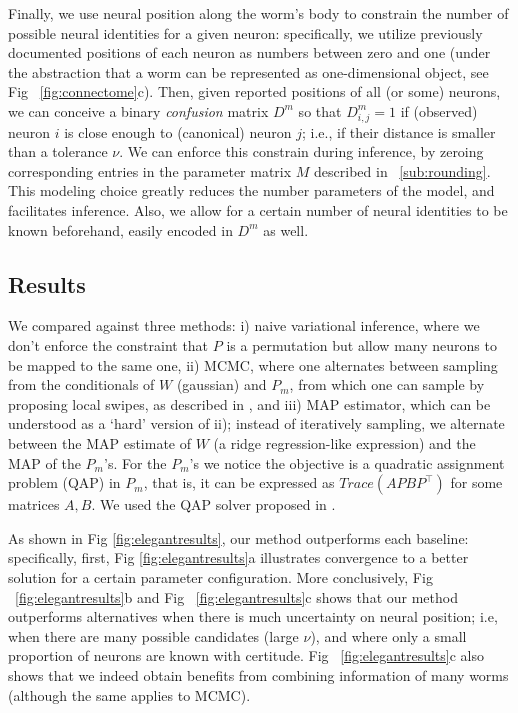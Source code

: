 \documentclass[twoside]{article}
\begin{document}
Finally, we use neural position along the worm's body to constrain the number of possible neural identities for a given neuron: specifically, we utilize previously documented positions of each neuron as numbers between zero and one \cite{white1986structure,wormatlas} (under the abstraction that a worm can be represented as one-dimensional object, see Fig ~\ref{fig:connectome}c). Then, given reported positions of all (or some) neurons, we can conceive a binary \textit{confusion} matrix $D^m$ so that $D^m_{i,j}=1$ if (observed) neuron $i$ is close enough to (canonical) neuron $j$; i.e., if their distance is smaller than a tolerance $\nu$. We can enforce this constrain during inference, by zeroing corresponding entries in the parameter matrix $M$ described in ~\ref{sub:rounding}.  This modeling choice greatly reduces the number parameters of the model, and facilitates inference. Also, we allow for a certain number of neural identities to be known beforehand, easily encoded in $D^m$ as well.

\subsection{Results}

We compared against three methods: i) naive variational inference, where we don't enforce the constraint that $P$ is a permutation but allow many neurons to be mapped to the same one, ii) MCMC, where one alternates between sampling from the conditionals of $W$ (gaussian) and $P_m$, from which one can sample by proposing local swipes, as described in \cite{Diaconis2009}, and iii) MAP estimator, which can be understood as a `hard' version of ii); instead of iteratively sampling, we alternate between the MAP estimate of $W$ (a ridge regression-like expression) and the MAP of the $P_m$'s. For the $P_m$'s we notice the objective is a quadratic assignment problem (QAP) in $P_m$, that is, it can be expressed as $Trace(APBP^\top)$ for some matrices $A,B$. We used the QAP solver proposed in \cite{Vogelstein2015}. 

As shown in Fig \ref{fig:elegantresults}, our method outperforms each baseline: specifically,  first, Fig \ref{fig:elegantresults}a illustrates convergence to a better solution for a certain parameter configuration. More conclusively, Fig ~\ref{fig:elegantresults}b and  Fig ~\ref{fig:elegantresults}c shows that our method outperforms alternatives when there is much uncertainty on neural position; i.e, when there are many possible candidates (large $\nu$), and where only a small proportion of neurons are known with certitude. Fig ~\ref{fig:elegantresults}c also shows that we indeed obtain benefits from combining information of many worms (although the same applies to MCMC). 
\end{document}
